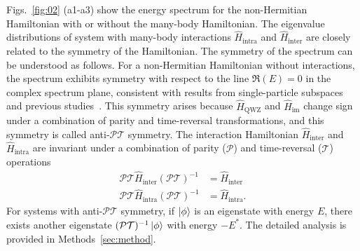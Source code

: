 \documentclass[longbibliography, aps, prx, amsmath, amssymb, amsfonts, twocolumn,superscriptaddress, footinbib]{revtex4-1}
\begin{document}
	Figs.~\ref{fig:02} (a1-a3) show the energy spectrum
	for the non-Hermitian Hamiltonian with or without the many-body Hamiltonian. 
	The eigenvalue distributions of system with many-body interactions $\hat{H}_{\text{intra}}$ and $\hat{H}_{\text{inter}}$ are closely related to the symmetry of the Hamiltonian. The 
	symmetry of the spectrum can be understood as follows. For a non-Hermitian Hamiltonian without interactions, the spectrum exhibits symmetry with respect to the line $\Re(E)=0$ in the complex spectrum plane, consistent with results from single-particle subspaces and previous studies~\cite{nakamura2023universal, ma2024non,schindler2023hermitian}. 
	This symmetry arises because $\hat{H}_{\text{QWZ}}$ and $\hat{H}_{\text{im}}$ change sign under a combination of parity and time-reversal transformations, and this symmetry is called anti-$\mathcal{PT}$ symmetry.
	The interaction Hamiltonian $\hat{H}_{\text{inter}}$ and $\hat{H}_{\text{intra}}$ are invariant under a combination of parity ($\mathcal{P}$) and time-reversal ($\mathcal{T}$) operations
	\begin{equation}
		\begin{split}
			\mathcal{PT} \hat{H}_{\text{inter}} (\mathcal{PT})^{-1} &= \hat{H}_{\text{inter}} \\%
			\mathcal{PT} \hat{H}_{\text{intra}} (\mathcal{PT})^{-1} &= \hat{H}_{\text{intra}}.
		\end{split}
	\end{equation}
	For systems with anti-$\mathcal{PT}$ symmetry, if $\ket{\phi}$ is an eigenstate with energy $E$, there exists another eigenstate $(\mathcal{PT})^{-1} \ket{\phi}$ with energy $-E^*$. The detailed analysis is provided in Methods~\ref{sec:method}.
\end{document}
